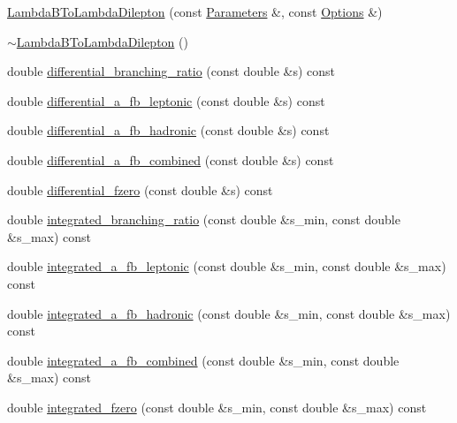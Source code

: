 \begin{DoxyCompactItemize}
\item 
\hyperlink{classeos_1_1LambdaBToLambdaDilepton_3_01LargeRecoil_01_4_a4856b87a348441b6af74a3d8a3e9399e}{LambdaBToLambdaDilepton} (const \hyperlink{classeos_1_1Parameters}{Parameters} \&, const \hyperlink{classeos_1_1Options}{Options} \&)
\item 
\hyperlink{classeos_1_1LambdaBToLambdaDilepton_3_01LargeRecoil_01_4_a561469823727e477359bfc10325cc56d}{$\sim$LambdaBToLambdaDilepton} ()
\item 
double \hyperlink{classeos_1_1LambdaBToLambdaDilepton_3_01LargeRecoil_01_4_a80c540e80ce4058cdd7286474cee504b}{differential\_\-branching\_\-ratio} (const double \&s) const 
\item 
double \hyperlink{classeos_1_1LambdaBToLambdaDilepton_3_01LargeRecoil_01_4_a60b3b7b57847fa0e6d65382e00573175}{differential\_\-a\_\-fb\_\-leptonic} (const double \&s) const 
\item 
double \hyperlink{classeos_1_1LambdaBToLambdaDilepton_3_01LargeRecoil_01_4_ad117f028e7cc1c231bc55c8ed2ef6ab6}{differential\_\-a\_\-fb\_\-hadronic} (const double \&s) const 
\item 
double \hyperlink{classeos_1_1LambdaBToLambdaDilepton_3_01LargeRecoil_01_4_a69dd49e2f5fd70106ef8c32dc0268808}{differential\_\-a\_\-fb\_\-combined} (const double \&s) const 
\item 
double \hyperlink{classeos_1_1LambdaBToLambdaDilepton_3_01LargeRecoil_01_4_a9af604dbacc9b5549540fb91212fd071}{differential\_\-fzero} (const double \&s) const 
\item 
double \hyperlink{classeos_1_1LambdaBToLambdaDilepton_3_01LargeRecoil_01_4_a83fa63546f5fc4c9e49ea542fa2ca903}{integrated\_\-branching\_\-ratio} (const double \&s\_\-min, const double \&s\_\-max) const 
\item 
double \hyperlink{classeos_1_1LambdaBToLambdaDilepton_3_01LargeRecoil_01_4_a2b2ddd2fb25343fdecd5e782bb5bda82}{integrated\_\-a\_\-fb\_\-leptonic} (const double \&s\_\-min, const double \&s\_\-max) const 
\item 
double \hyperlink{classeos_1_1LambdaBToLambdaDilepton_3_01LargeRecoil_01_4_a9f26950464c21533e4620d70d25473b6}{integrated\_\-a\_\-fb\_\-hadronic} (const double \&s\_\-min, const double \&s\_\-max) const 
\item 
double \hyperlink{classeos_1_1LambdaBToLambdaDilepton_3_01LargeRecoil_01_4_a2f3dff9b5c595702373e069fff4ff718}{integrated\_\-a\_\-fb\_\-combined} (const double \&s\_\-min, const double \&s\_\-max) const 
\item 
double \hyperlink{classeos_1_1LambdaBToLambdaDilepton_3_01LargeRecoil_01_4_a309b1c0c5d175cd306ed76404d00f5f8}{integrated\_\-fzero} (const double \&s\_\-min, const double \&s\_\-max) const 
\end{DoxyCompactItemize}
